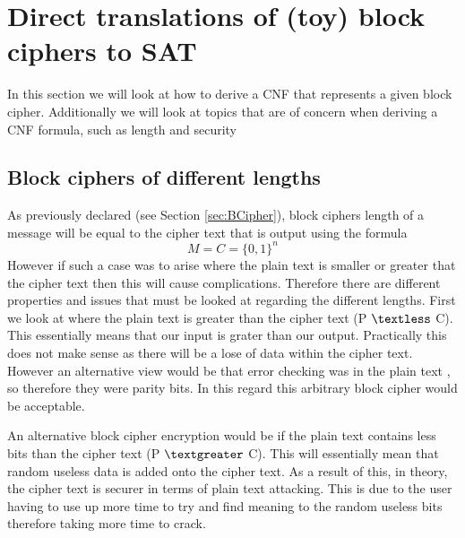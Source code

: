 \documentclass[11pt,a4paper]{report}
\begin{document}
\chapter{Direct translations of (toy) block ciphers to SAT}
\label{cha:dirtrans}

In this section we will look at how to derive a CNF that represents a given block cipher. Additionally we will look at topics that are of concern when deriving a CNF formula, such as length and security

\section{Block ciphers of different lengths}
\label{sec:Blockciphersdiff}

As previously declared (see Section \ref{sec:BCipher}), block ciphers length of a message will be equal to the cipher text that is output using the formula 
\begin{displaymath}
 M = C = \{0,1\}^{n}
\end{displaymath}
However if such a case was to arise where the plain text is smaller or greater that the cipher text then this will cause complications. Therefore there are different properties and issues that must be looked at regarding the different lengths. First we look at where the plain text is greater than the cipher text (P $\textless$ C). This essentially means that our input is grater than our output. Practically this does not make sense as there will be a lose of data within the cipher text.  However an alternative view would be that error checking was in the plain text , so therefore they were parity bits. In this regard this arbitrary block cipher would be acceptable.

An alternative block cipher encryption would be if the plain text contains less bits than the cipher text (P $\textgreater$ C). This will essentially mean that random useless data is added onto the cipher text. As a result of this, in theory, the cipher text is securer in terms of plain text attacking. This is due to the user having to use up more time to try and find meaning to the random useless bits therefore taking more time to crack.
\end{document}
